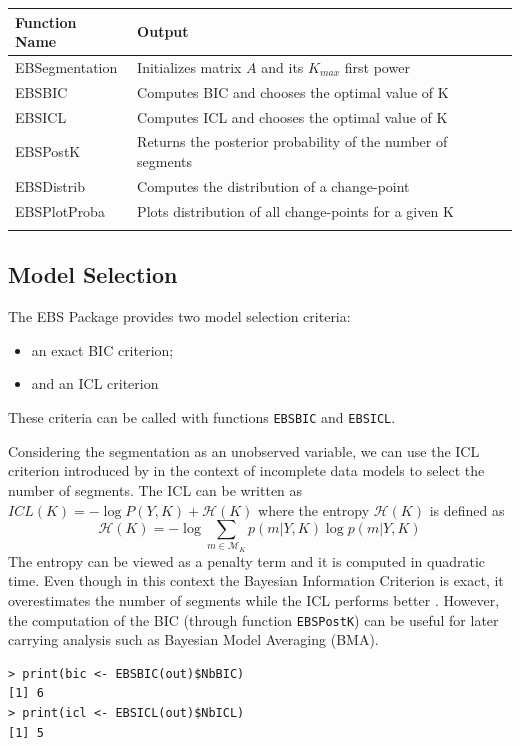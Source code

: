 \documentclass{bioinfo}
\begin{document}
\begin{methods}
\begin{table}[!t]
{\begin{tabular}{ll}\toprule
Function Name & Output \\\midrule
 EBSegmentation & Initializes matrix $A$ and its $K_{max}$ first power\\
 EBSBIC & Computes BIC and chooses the optimal value of K \\
 EBSICL & Computes ICL and chooses the optimal value of K \\
 EBSPostK & Returns the posterior probability of the number of segments\\
 EBSDistrib & Computes the distribution of a change-point\\
 EBSPlotProba & Plots distribution of all change-points for a given K\\\botrule
\end{tabular}}{}
\end{table}




\subsection{Model Selection}

The EBS Package provides two model selection criteria:
\begin{itemize}
\item an exact BIC criterion;
\item and an ICL criterion
\end{itemize}


These criteria can be called with functions \texttt{EBSBIC} and \texttt{EBSICL}. 

Considering the segmentation as an unobserved variable, we can use the ICL criterion introduced by \cite{biernacki_assessingmixture_2000} in the context of incomplete data models to select the number of segments. 
The ICL can be written as $ICL(K) = -\log P(Y,K) + \mathcal{H}(K) \label{ICL}$ where
the entropy $\mathcal{H}(K)$ is defined as
\begin{equation}
  \mathcal{H}(K)=-\log \sum_{m\in \mathcal{M}_K} p(m|Y,K) \log p(m|Y,K)
\end{equation}
The entropy can be viewed as a penalty term and it is computed in quadratic time. 
 Even though in this context the Bayesian Information Criterion is exact, it overestimates the number of segments while the ICL performs better \citep{rigaill_exact_2011}. However, the computation of the BIC (through function \texttt{EBSPostK}) can be useful for later carrying analysis such as Bayesian Model Averaging (BMA).
\begin{verbatim}
> print(bic <- EBSBIC(out)$NbBIC)
[1] 6
> print(icl <- EBSICL(out)$NbICL)
[1] 5


\end{verbatim}
\end{methods}
\end{document}

